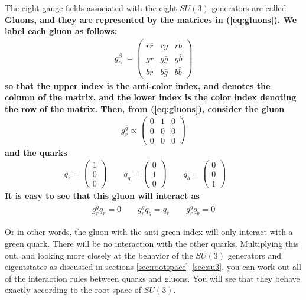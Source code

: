 \documentclass[12pt,epsf]{article}
\def\nolabel{\nonumber }
\def\nolabel{\nonumber }
\begin{document}
The eight gauge fields associated with the eight $SU(3)$ generators are
called \bf Gluons\rm, and they are represented by the matrices in
(\ref{eq:gluons}).  We label each gluon as follows:
\begin{eqnarray}
g^{\beta}_{\alpha}~\dot{=} 
\begin{pmatrix}
r\bar r & r \bar g & r \bar b \\
g \bar r & g \bar g & g \bar b \\
b \bar r & b \bar g & b \bar b
\end{pmatrix}\nolabel
\end{eqnarray}
so that the upper index is the anti-color index, and denotes the column
of the matrix, and the lower index is the color index denoting the row
of the matrix.	Then, from (\ref{eq:gluons}), consider the gluon
\begin{eqnarray}
g^{\bar g}_r \propto 
\begin{pmatrix}
0 & 1 & 0 \\
0 & 0 & 0 \\
0 & 0 & 0 
\end{pmatrix}\nolabel
\end{eqnarray}
and the quarks
\begin{eqnarray}
q_r = \begin{pmatrix} 1 \\ 0 \\ 0 \end{pmatrix} \qquad 
q_g =\begin{pmatrix} 0 \\ 1 \\ 0 \end{pmatrix} \qquad  
q_b = \begin{pmatrix} 0 \\ 0 \\ 1 \end{pmatrix} \qquad \nolabel
\end{eqnarray}
It is easy to see that this gluon will interact as 
\begin{eqnarray}
g_r^{\bar g} q_r = 0 \qquad g_r^{\bar g}q_g = q_r \qquad g_r^{\bar
g}q_b = 0\nolabel
\end{eqnarray}

Or in other words, the gluon with the anti-green index will only
interact with a green quark.  There will be no interaction with the
other quarks.  Multiplying this out, and looking more closely at the
behavior of the $SU(3)$ generators and eigentstates as discussed in
sections \ref{sec:rootspace}--\ref{sec:su3}, you can work out all of
the interaction rules between quarks and gluons.  You will see that
they behave exactly according to the root space of $SU(3)$.  
\end{document}
